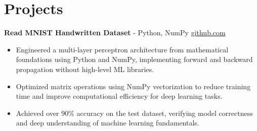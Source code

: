 \documentclass[11pt]{article}       %
\begin{document}

\vspace{-18.5pt}

\section*{Projects}

\textbf{Read MNIST Handwritten Dataset}{ - Python, NumPy} \hfill \href{https://github.com/Monica20030707/Artificial-Neutral-Network_ML}{github.com} \\
\vspace{-9pt}
\begin{itemize}
  \item Engineered a multi-layer perceptron architecture from mathematical foundations using Python and NumPy, implementing forward and backward propagation without high-level ML libraries.
  \item Optimized matrix operations using NumPy vectorization to reduce training time and improve computational efficiency for deep learning tasks.
  \item Achieved over 90\% accuracy on the test dataset, verifying model correctness and deep understanding of machine learning fundamentals.
\end{itemize}

\end{document}
